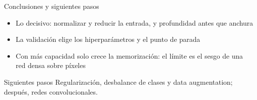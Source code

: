 \begin{frame}{Conclusiones y siguientes pasos}
  \begin{itemize}
    \item Lo decisivo: normalizar y reducir la entrada, y profundidad antes que anchura
    \item La validación elige los hiperparámetros y el punto de parada
    \item Con más capacidad solo crece la memorización: el límite es el sesgo de una red densa sobre píxeles
  \end{itemize}
  \vspace{0.2cm}
  \begin{alertblock}{Siguientes pasos}
    Regularización, desbalance de clases y data augmentation; después, redes convolucionales.
  \end{alertblock}
\end{frame}
